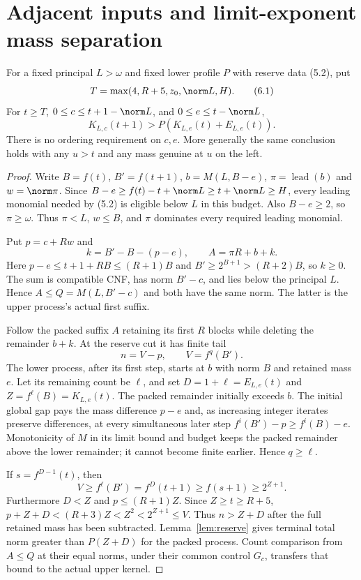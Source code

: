 \documentclass[11pt,a4paper]{article}
\newcommand{\KK}[2]{K_{#1,#2}}
\newcommand{\EE}[2]{E_{#1,#2}}
\begin{document}
\section{Adjacent inputs and limit-exponent mass separation}
\begin{theorem}\label{thm:adjacent}
For a fixed principal $L>\omega$ and fixed lower profile $P$ with reserve
data (5.2), put
\[
              T=\max(4,R+5,z_0,\norm L,H).            \tag{6.1}
\]
For $t\ge T$, $0\le c\le t+1-\norm L$, and
$0\le e\le t-\norm L$,
\[
       \KK Lc(t+1)>P(\KK Le(t)+\EE Le(t)).            \tag{6.2}
\]
There is no ordering requirement on $c,e$. More generally the same
conclusion holds with any $u>t$ and any mass genuine at $u$ on the left.
\end{theorem}
\begin{proof}
Write $B=f(t)$, $B'=f(t+1)$, $b=M(L,B-e)$,
$\pi=\operatorname{lead}(b)$ and $w=\norm\pi$. Since
$B-e\ge f(t)-t+\norm L\ge t+\norm L\ge H$, every leading monomial
needed by (5.2) is eligible below $L$ in this budget. Also $B-e\ge2$,
so $\pi\ge\omega$. Thus $\pi<L$, $w\le B$, and $\pi$ dominates
every required leading monomial.

Put $p=c+Rw$ and
\[
 k=B'-B-(p-e),\qquad A=\pi R+b+k.
\]
Here $p-e\le t+1+RB\le(R+1)B$ and
$B'\ge2^{B+1}>(R+2)B$, so $k\ge0$. The sum is compatible CNF,
has norm $B'-c$, and lies below the principal $L$. Hence
$A\le Q=M(L,B'-c)$ and both have the same norm. The latter is the
upper process's actual first suffix.

Follow the packed suffix $A$ retaining its first $R$ blocks while deleting
the remainder $b+k$. At the reserve cut it has finite tail
\[
               n=V-p,\qquad V=f^q(B').              \tag{6.3}
\]
The lower process, after its first step, starts at $b$ with norm $B$
and retained mass $e$. Let its remaining count be $\ell$, and set
$D=1+\ell=\EE Le(t)$ and $Z=f^\ell(B)=\KK Le(t)$.
The packed remainder initially exceeds $b$. The initial global gap pays
the mass difference $p-e$ and, as increasing integer iterates preserve
differences, at every simultaneous later step
$f^i(B')-p\ge f^i(B)-e$. Monotonicity of $M$ in its limit bound and
budget keeps the packed remainder above the lower remainder; it cannot
become finite earlier. Hence $q\ge\ell$.

If $s=f^{D-1}(t)$, then
\[
 V\ge f^\ell(B')=f^D(t+1)\ge f(s+1)\ge2^{Z+1}.
\]
Furthermore $D<Z$ and $p\le(R+1)Z$. Since $Z\ge t\ge R+5$,
$p+Z+D<(R+3)Z<Z^2<2^{Z+1}\le V$. Thus $n>Z+D$ after the full
retained mass has been subtracted. Lemma~\ref{lem:reserve} gives terminal
total norm greater than $P(Z+D)$ for the packed process. Count comparison
from $A\le Q$ at their equal norms, under their common control $G_c$,
transfers that bound to the actual upper kernel.


\end{proof}
\end{document}
